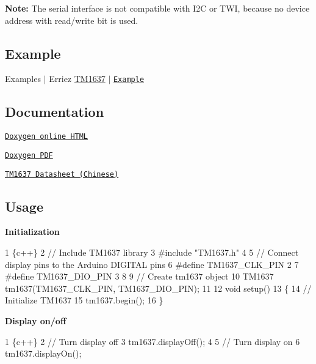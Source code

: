 {\bfseries Note\+:} The serial interface is not compatible with I2C or T\+WI, because no device address with read/write bit is used.

\subsection*{Example}


\begin{DoxyItemize}
\item Examples $\vert$ Erriez \hyperlink{class_t_m1637}{T\+M1637} $\vert$ \href{https://github.com/Erriez/ErriezTM1637/blob/master/examples/Example/Example.ino}{\tt Example}
\end{DoxyItemize}

\subsection*{Documentation}


\begin{DoxyItemize}
\item \href{https://Erriez.github.io/ErriezTM1637}{\tt Doxygen online H\+T\+ML}
\item \href{https://github.com/Erriez/ErriezTM1637/raw/gh-pages/latex/ErriezTM1637.pdf}{\tt Doxygen P\+DF}
\item \href{https://github.com/Erriez/ErriezTM1637/blob/master/extras/TM1637_datasheet_chinese.pdf}{\tt T\+M1637 Datasheet (Chinese)}
\end{DoxyItemize}

\subsection*{Usage}

{\bfseries Initialization}


\begin{DoxyCode}
1 \{c++\}
2 // Include TM1637 library
3 #include "TM1637.h"
4 
5 // Connect display pins to the Arduino DIGITAL pins
6 #define TM1637\_CLK\_PIN   2
7 #define TM1637\_DIO\_PIN   3
8 
9 // Create tm1637 object
10 TM1637 tm1637(TM1637\_CLK\_PIN, TM1637\_DIO\_PIN);
11 
12 void setup()
13 \{
14     // Initialize TM1637
15     tm1637.begin();
16 \}
\end{DoxyCode}


{\bfseries Display on/off}


\begin{DoxyCode}
1 \{c++\}
2 // Turn display off
3 tm1637.displayOff();
4 
5 // Turn display on
6 tm1637.displayOn();
\end{DoxyCode}


